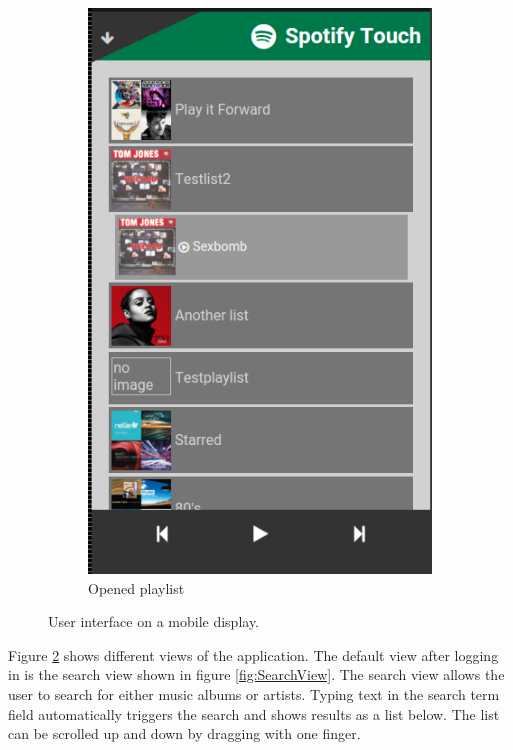 \documentclass[conference]{IEEEtran}
\begin{document}
\begin{figure}[htbp]
\begin{subfigure}{0.45\columnwidth}
        \includegraphics[width=0.9\linewidth]{playlistopen.png}
        \caption{Opened playlist}
        \label{fig:PlaylistOpen}
    
    \end{subfigure}
    \caption{User interface on a mobile display.}
    \label{fig:GUI}
\end{figure}

Figure \ref{fig:GUI} shows different views of the application. The default view after logging in is the search view shown in figure \ref{fig:SearchView}. The search view allows the user to search for either music albums or artists. Typing text in the search term field automatically triggers the search and shows results as a list below.
The list can be scrolled up and down by dragging with one finger.
\end{document}

